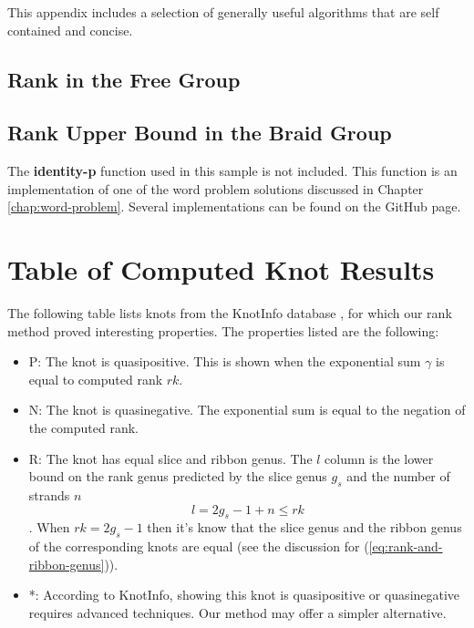 \documentclass[12pt]{thesis}
\begin{document}
This appendix includes a selection of generally useful algorithms
that are self contained and concise.

\section{Rank in the Free Group}

\label{free-rank-code}

\begin{singlespace}
    
\end{singlespace}

\section{Rank Upper Bound in the Braid Group}

The \textbf{identity-p} function used in this sample
is not included.
This function is an implementation of one of the word problem solutions
discussed in Chapter \ref{chap:word-problem}.
Several implementations can be found on the GitHub page.

\label{braid-rank-code}

\begin{singlespace}
    
\end{singlespace}

\chapter{Table of Computed Knot Results}

\label{knotinfo-table} 

The following table lists knots from the KnotInfo 
database \cite{knotinfo},
for which our rank method proved interesting properties.
The properties listed are the following:
\begin{itemize}
    \item P: The knot is quasipositive. This is shown when the exponential sum $\gamma$ is equal to computed rank $rk$.
    \item N: The knot is quasinegative. The exponential sum is equal to the negation of the computed rank.
    \item R: The knot has equal slice and ribbon genus.
        The $l$ column is the lower bound on the rank
        genus predicted by the slice genus $g_{s}$ and the number of strands $n$
        \[
            l = 2g_{s} - 1 + n \leq rk
        \].
        When $rk = 2g_{s} - 1$ then it's know that the slice genus
        and the ribbon genus of the corresponding knots are equal
        (see the discussion for (\ref{eq:rank-and-ribbon-genus})).

   \item *: According to KnotInfo, showing this knot is quasipositive or
            quasinegative requires
            advanced techniques.
            Our method may offer a simpler alternative.
\end{itemize}
\end{document}
